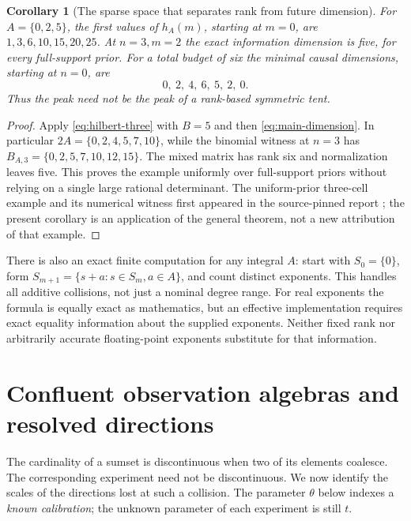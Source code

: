 \documentclass[11pt]{amsart}
\newtheorem{corollary}[theorem]{Corollary}
\theoremstyle{definition}\newtheorem{definition}[theorem]{Definition}
\theoremstyle{remark}\newtheorem{remark}[theorem]{Remark}
\begin{document}
\begin{corollary}[The sparse space that separates rank from future dimension]\label{cor:sparse-example}
For $A=\{0,2,5\}$, the first values of $h_A(m)$, starting at $m=0$,
are $1,3,6,10,15,20,25$. At $n=3,m=2$ the exact information dimension
is five, for every full-support prior. For a total budget of six the
minimal causal dimensions, starting at $n=0$, are
\[
 0,\ 2,\ 4,\ 6,\ 5,\ 2,\ 0.
\]
Thus the peak need not be the peak of a rank-based symmetric tent.
\end{corollary}
\begin{proof}
Apply \eqref{eq:hilbert-three} with $B=5$ and then
\eqref{eq:main-dimension}. In particular
$2A=\{0,2,4,5,7,10\}$, while the binomial witness at $n=3$ has
$B_{A,3}=\{0,2,5,7,10,12,15\}$. The mixed matrix has rank six
and normalization leaves five. This proves the example uniformly over
full-support priors without relying on a single large rational determinant.
The uniform-prior three-cell example and its numerical witness first
appeared in the source-pinned report \cite{A1review}; the present
corollary is an application of the general theorem, not a new attribution
of that example.
\end{proof}

There is also an exact finite computation for any integral $A$: start
with $S_0=\{0\}$, form $S_{m+1}=\{s+a:s\in S_m,a\in A\}$, and
count distinct exponents. This handles all additive collisions, not just
a nominal degree range. For real exponents the formula is equally exact
as mathematics, but an effective implementation requires exact equality
information about the supplied exponents. Neither fixed rank nor arbitrarily
accurate floating-point exponents substitute for that information.

\section{Confluent observation algebras and resolved directions}\label{sec:confluence}
The cardinality of a sumset is discontinuous when two of its elements
coalesce. The corresponding experiment need not be discontinuous. We now
identify the scales of the directions lost at such a collision. The
parameter $\theta$ below indexes a \emph{known calibration}; the unknown
parameter of each experiment is still $t$.
\end{document}
